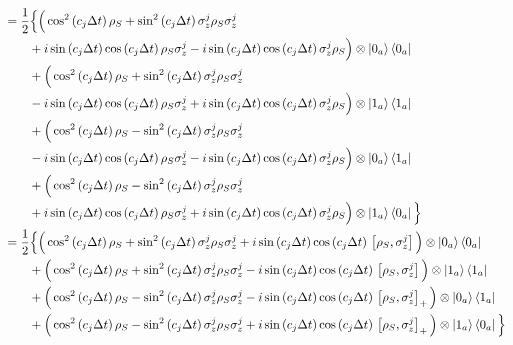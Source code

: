 \documentclass[a4paper,12pt]{article}
\begin{document}
\begin{align*}
		& = \frac{1}{2} \Big\{ \Big( \cos^{2}{\left( c_j \Delta t \right)} \, \rho_S + \sin^{2}{\left( c_j \Delta t \right)} \, \sigma_{z}^{j}\rho_S\sigma_{z}^{j} \\
		& \qquad +i \sin{\left( c_j \Delta t \right)}\cos{\left( c_j \Delta t \right)} \, \rho_S \sigma_{z}^{j} - i \sin{\left( c_j \Delta t \right)}\cos{\left( c_j \Delta t \right)} \, \sigma_{z}^{j} \rho_S \Big) \otimes \ket{0_a}\bra{0_a} \\
		& \qquad  + \Big( \cos^{2}{\left( c_j \Delta t \right)} \, \rho_S + \sin^{2}{\left( c_j \Delta t \right)} \, \sigma_{z}^{j}\rho_S\sigma_{z}^{j} \\
		& \qquad - i \sin{\left( c_j \Delta t \right)}\cos{\left( c_j \Delta t \right)} \, \rho_S \sigma_{z}^{j} + i \sin{\left( c_j \Delta t \right)}\cos{\left( c_j \Delta t \right)} \, \sigma_{z}^{j} \rho_S \Big) \otimes \ket{1_a}\bra{1_a} \\
		& \qquad  + \Big( \cos^{2}{\left( c_j \Delta t \right)} \, \rho_S - \sin^{2}{\left( c_j \Delta t \right)} \, \sigma_{z}^{j}\rho_S\sigma_{z}^{j} \\
		& \qquad - i \sin{\left( c_j \Delta t \right)}\cos{\left( c_j \Delta t \right)} \, \rho_S \sigma_{z}^{j} - i \sin{\left( c_j \Delta t \right)}\cos{\left( c_j \Delta t \right)} \, \sigma_{z}^{j} \rho_S \Big) \otimes \ket{0_a}\bra{1_a} \\
		& \qquad  + \Big( \cos^{2}{\left( c_j \Delta t \right)} \, \rho_S - \sin^{2}{\left( c_j \Delta t \right)} \, \sigma_{z}^{j}\rho_S\sigma_{z}^{j} \\
		& \qquad + i \sin{\left( c_j \Delta t \right)}\cos{\left( c_j \Delta t \right)} \, \rho_S \sigma_{z}^{j} + i \sin{\left( c_j \Delta t \right)}\cos{\left( c_j \Delta t \right)} \, \sigma_{z}^{j} \rho_S \Big) \otimes \ket{1_a}\bra{0_a} \Big\} \\
		& = \frac{1}{2} \Big\{ \Big( \cos^{2}{\left( c_j \Delta t \right)} \, \rho_S + \sin^{2}{\left( c_j \Delta t \right)} \, \sigma_{z}^{j}\rho_S\sigma_{z}^{j}
		+i \sin{\left( c_j \Delta t \right)}\cos{\left( c_j \Delta t \right)} \, \left[ \rho_S, \sigma_{z}^{j} \right] \Big) \otimes \ket{0_a}\bra{0_a} \\
		& \qquad  + \Big( \cos^{2}{\left( c_j \Delta t \right)} \, \rho_S + \sin^{2}{\left( c_j \Delta t \right)} \, \sigma_{z}^{j}\rho_S\sigma_{z}^{j}
		-i \sin{\left( c_j \Delta t \right)}\cos{\left( c_j \Delta t \right)} \, \left[ \rho_S, \sigma_{z}^{j} \right] \Big) \otimes \ket{1_a}\bra{1_a} \\
		& \qquad  + \Big( \cos^{2}{\left( c_j \Delta t \right)} \, \rho_S - \sin^{2}{\left( c_j \Delta t \right)} \, \sigma_{z}^{j}\rho_S\sigma_{z}^{j}
		-i \sin{\left( c_j \Delta t \right)}\cos{\left( c_j \Delta t \right)} \, \left[ \rho_S, \sigma_{z}^{j} \right]_{+} \Big) \otimes \ket{0_a}\bra{1_a} \\
		& \qquad  + \Big( \cos^{2}{\left( c_j \Delta t \right)} \, \rho_S - \sin^{2}{\left( c_j \Delta t \right)} \, \sigma_{z}^{j}\rho_S\sigma_{z}^{j}
		+i \sin{\left( c_j \Delta t \right)}\cos{\left( c_j \Delta t \right)} \, \left[ \rho_S, \sigma_{z}^{j} \right]_{+} \Big) \otimes \ket{1_a}\bra{0_a} \Big\}
	\end{align*}
\end{document}
